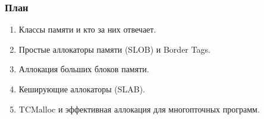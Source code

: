\begin{frame}
\frametitle{План}

\begin{enumerate}
  \item Классы памяти и кто за них отвечает.
  \item Простые аллокаторы памяти (SLOB) и Border Tags.
  \item Аллокация больших блоков памяти.
  \item Кеширующие аллокаторы (SLAB).
  \item TCMalloc и эффективная аллокация для многопточных программ.
\end{enumerate}
\end{frame}

